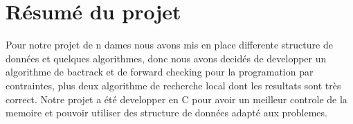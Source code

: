 \section{Résumé du projet}
 
Pour notre projet de n dames nous avons mis en place differente structure de données et quelques algorithmes, donc nous avons decidés de developper un algorithme de bactrack et de forward checking pour la programation par contraintes, plus deux algorithme de recherche local dont les resultats sont très correct. Notre projet a été developper en C pour avoir un meilleur controle de la memoire et pouvoir utiliser des structure de données adapté aux problemes.  